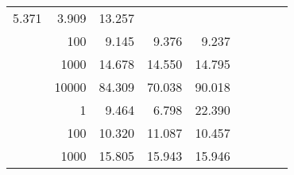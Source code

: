 \begin{table}
\begin{tabular}{rrrrrrrrr}
						
							    
							    
	                           5.371 & 3.909 & 13.257  \\
	                
	            
					 &  
					 
					\multirow{ 1 }{*}{ 100 } &
					
						
							    
							    
	                           9.145 & 9.376 & 9.237  \\
	                
	            
					 &  
					 
					\multirow{ 1 }{*}{ 1000 } &
					
						
							    
							    
	                           14.678 & 14.550 & 14.795  \\
	                
	            
					 &  
					 
					\multirow{ 1 }{*}{ 10000 } &
					
						
							    
							    
	                           84.309 & 70.038 & 90.018  \\
	                
	            
	        
				\noalign{\smallskip}\hline
				\multirow{ 4 }{*}{ 1000000 } &
				
					
					 
					\multirow{ 1 }{*}{ 1 } &
					
						
							    
							    
	                           9.464 & 6.798 & 22.390  \\
	                
	            
					 &  
					 
					\multirow{ 1 }{*}{ 100 } &
					
						
							    
							    
	                           10.320 & 11.087 & 10.457  \\
	                
	            
					 &  
					 
					\multirow{ 1 }{*}{ 1000 } &
					
						
							    
							    
	                           15.805 & 15.943 & 15.946  \\
	                

\end{tabular}
\end{table}
